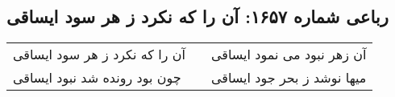 \begin{center}
\section*{رباعی شماره ۱۶۵۷: آن را که نکرد ز هر سود ایساقی}
\label{sec:1657}
\begin{longtable}{l p{0.5cm} r}
آن را که نکرد ز هر سود ایساقی
&&
آن زهر نبود می نمود ایساقی
\\
چون بود رونده شد نبود ایساقی
&&
میها نوشد ز بحر جود ایساقی
\\
\end{longtable}
\end{center}
